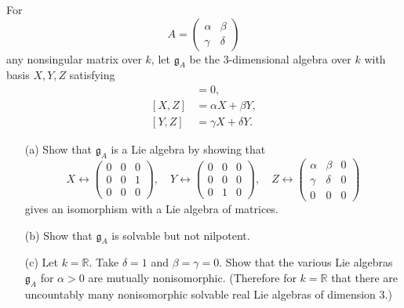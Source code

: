\documentclass{report}
\begin{document}
\begin{exercise}[Exercise I.2]\label{ex:solvable_not_nilpotent}
    For 
\[
A = \begin{pmatrix}
\alpha & \beta \\
\gamma & \delta
\end{pmatrix}
\]
any nonsingular matrix over $k$, let $\mathfrak{g}_A$ be the 3-dimensional algebra over $k$ with basis $X, Y, Z$ satisfying
\begin{align*}
    [X, Y] &= 0,\\
    [X, Z] &= \alpha X + \beta Y,\\
    [Y, Z] &= \gamma X + \delta Y.    
\end{align*}


\begin{itemize}
    \item[(a)] Show that $\mathfrak{g}_A$ is a Lie algebra by showing that
    \[
    X \leftrightarrow \begin{pmatrix} 0 & 0 & 0 \\ 0 & 0 & 1 \\ 0 & 0 & 0 \end{pmatrix}, \quad Y \leftrightarrow \begin{pmatrix} 0 & 0 & 0 \\ 0 & 0 & 0 \\ 0 & 1 & 0 \end{pmatrix}, \quad Z \leftrightarrow \begin{pmatrix} \alpha & \beta & 0 \\ \gamma & \delta & 0 \\ 0 & 0 & 0 \end{pmatrix}
    \]
    gives an isomorphism with a Lie algebra of matrices.
    
    \item[(b)] Show that $\mathfrak{g}_A$ is solvable but not nilpotent.
    
    \item[(c)] Let $k = \mathbb{R}$. Take $\delta = 1$ and $\beta = \gamma = 0$. Show that the various Lie algebras $\mathfrak{g}_A$ for $\alpha > 0$ are mutually nonisomorphic. (Therefore for $k = \mathbb{R}$ that there are uncountably many nonisomorphic solvable real Lie algebras of dimension 3.)
\end{itemize}
\end{exercise}
\end{document}
